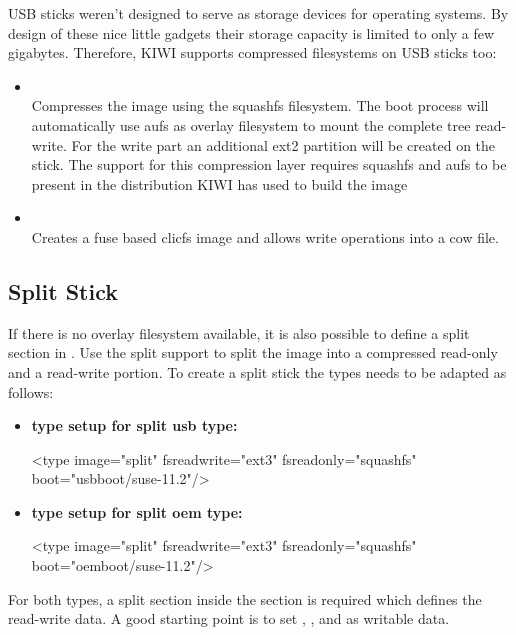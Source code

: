USB sticks weren't designed to serve as storage devices for
operating systems. By design of these nice little gadgets their
storage capacity is limited to only a few gigabytes. Therefore,
KIWI supports compressed filesystems on USB sticks too:

\begin{itemize}
\item {}\\
      Compresses the image using the squashfs filesystem. The
      boot process will automatically use aufs as overlay filesystem to
      mount the complete tree read-write. For the write part an additional
      ext2 partition will be created on the stick. The support for this
      compression layer requires squashfs and aufs to be present in
      the distribution KIWI has used to build the image 
\item {}\\
      Creates a fuse based clicfs image and allows write operations
      into a cow file.
\end{itemize}

\subsection{Split Stick}
If there is no overlay filesystem available, it is also possible to
define a split section in . Use the split support to
split the image into a compressed read-only and a read-write portion.
To create a split stick the types needs to be adapted as follows:

\begin{itemize}
\item \textbf{type setup for split usb type:}

\begin{xml}
<type image="split" fsreadwrite="ext3" fsreadonly="squashfs"
      boot="usbboot/suse-11.2"/>
\end{xml}
\item \textbf{type setup for split oem type:}

\begin{xml}
<type image="split" fsreadwrite="ext3" fsreadonly="squashfs"
      boot="oemboot/suse-11.2"/>
\end{xml}
\end{itemize}

For both types, a split section inside the  section is required
which defines the read-write data. A good starting point is
to set , , and  as writable data.

